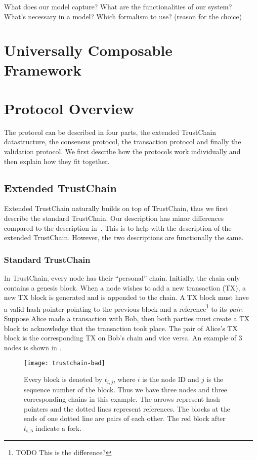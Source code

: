 What does our model capture?
What are the functionalities of our system?
What's necessary in a model?
Which formalism to use? (reason for the choice)

\section{Universally Composable Framework}

\section{Protocol Overview}
The protocol can be described in four parts, the extended TrustChain datastructure, 
the consensus protocol, the transaction protocol and finally the validation protocol.
We first describe how the protocols work individually and then explain how they fit together.

\subsection{Extended TrustChain}
Extended TrustChain naturally builds on top of TrustChain, thus we first describe the standard TrustChain.
Our description has minor differences compared to the description in~\cite{trustchain}.
This is to help with the description of the extended TrustChain.
However, the two descriptions are functionally the same.

\subsubsection*{Standard TrustChain}
In TrustChain, every node has their ``personal'' chain. 
Initially, the chain only contains a genesis block.
When a node wishes to add a new transaction (TX), a new TX block is generated and is appended to the chain.
A TX block must have a valid hash pointer pointing to the previous block
and a reference\footnote{TODO This is the difference?} to its \emph{pair}.
Suppose Alice made a transaction with Bob, then both parties must create a TX block to acknowledge that the transaction took place.
The pair of Alice's TX block is the corresponding TX on Bob's chain and vice versa.
An example of 3 nodes is shown in .
\begin{figure}
    \texttt{[image: trustchain-bad]}
    \centering
    \caption{Every block is denoted by $t_{i,j}$, where $i$ is the node ID and $j$ is the sequence number of the block.
    Thus we have three nodes and three corresponding chains in this example.
    The arrows represent hash pointers and the dotted lines represent references.
    The blocks at the ends of one dotted line are pairs of each other.
    The red block after $t_{b, 5}$ indicate a fork.}
    \label{fig:trustchain-bad}
\end{figure}


